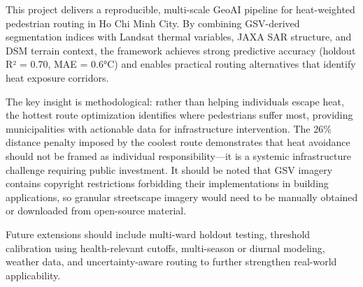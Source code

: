 \documentclass[
]{report}
\begin{document}
This project delivers a reproducible, multi-scale GeoAI pipeline for
heat-weighted pedestrian routing in Ho Chi Minh City. By combining
GSV-derived segmentation indices with Landsat thermal variables, JAXA
SAR structure, and DSM terrain context, the framework achieves strong
predictive accuracy (holdout R² = 0.70, MAE = 0.6°C) and enables
practical routing alternatives that identify heat exposure corridors.

The key insight is methodological: rather than helping individuals
escape heat, the hottest route optimization identifies where pedestrians
suffer most, providing municipalities with actionable data for
infrastructure intervention. The 26\% distance penalty imposed by the
coolest route demonstrates that heat avoidance should not be framed as
individual responsibility---it is a systemic infrastructure challenge
requiring public investment. It should be noted that GSV imagery
contains copyright restrictions forbidding their implementations in
building applications, so granular streetscape imagery would need to be
manually obtained or downloaded from open-source material.

Future extensions should include multi-ward holdout testing, threshold
calibration using health-relevant cutoffs, multi-season or diurnal
modeling, weather data, and uncertainty-aware routing to further
strengthen real-world applicability.
\end{document}
